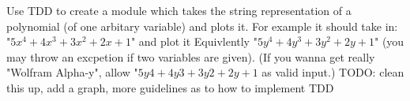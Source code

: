 \begin{problem}
Use TDD to create a module which takes the string representation of a polynomial (of one arbitary variable) and plots it. For example it should take in:
"$5x^4 + 4x^3 + 3x^2+ 2x + 1$" and plot it
Equivlently "$5y^4 + 4y^3 + 3y^2+ 2y + 1$" (you may throw an excpetion if two variables are given).
(If you wanna get really "Wolfram Alpha-y", allow "$5y4 + 4y3 + 3y2+ 2y + 1$ as valid input.)  TODO: clean this up, add a graph, more guidelines as to how to implement TDD
\end{problem}


